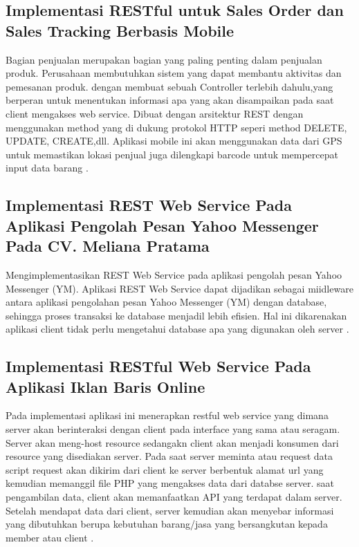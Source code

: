 \subsection{Implementasi RESTful untuk Sales Order dan Sales Tracking Berbasis Mobile}
Bagian penjualan merupakan bagian yang paling penting dalam penjualan produk. Perusahaan membutuhkan sistem yang dapat membantu aktivitas dan pemesanan produk. dengan membuat sebuah Controller terlebih dahulu,yang berperan untuk menentukan informasi apa yang akan disampaikan pada saat client mengakses web service. Dibuat dengan arsitektur REST dengan menggunakan method yang di dukung protokol HTTP seperi method DELETE, UPDATE, CREATE,dll. Aplikasi mobile ini akan menggunakan data dari GPS untuk memastikan lokasi penjual juga dilengkapi barcode untuk mempercepat input data barang \cite{kurniawan2015implementasi}.

\subsection{Implementasi REST Web Service Pada Aplikasi Pengolah Pesan Yahoo Messenger Pada CV. Meliana Pratama}
Mengimplementasikan REST Web Service pada aplikasi pengolah pesan Yahoo Messenger (YM). Aplikasi REST Web Service dapat dijadikan sebagai miidleware antara aplikasi pengolahan pesan Yahoo Messenger (YM) dengan database, sehingga proses transaksi ke database menjadil lebih efisien. Hal ini dikarenakan aplikasi client tidak perlu mengetahui database apa yang digunakan oleh server \cite{ikrom2015implementasi}.

\subsection{Implementasi RESTful Web Service Pada Aplikasi Iklan Baris Online}
Pada implementasi aplikasi ini menerapkan restful web service yang dimana server akan berinteraksi dengan client pada interface yang sama atau seragam. Server akan meng-host resource sedangakn client akan menjadi konsumen dari resource yang disediakan server. Pada saat server meminta atau request data script request akan dikirim dari client ke server berbentuk alamat url yang kemudian memanggil file PHP yang mengakses data dari databse server. saat pengambilan data, client akan memanfaatkan API yang terdapat dalam server. Setelah mendapat data dari client, server kemudian akan menyebar informasi yang dibutuhkan berupa kebutuhan barang/jasa yang bersangkutan kepada member atau client \cite{fauziah2014aplikasi}.

